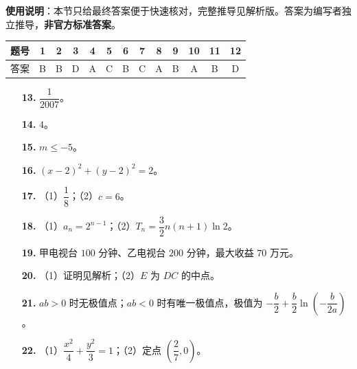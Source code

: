 
\begin{gknotice}
\textbf{使用说明}：本节只给最终答案便于快速核对，完整推导见解析版。答案为编写者独立推导，\textbf{非官方标准答案}。
\end{gknotice}

\begin{center}\begin{tabular}{ccccccccccccc}
\toprule
题号 & 1 & 2 & 3 & 4 & 5 & 6 & 7 & 8 & 9 & 10 & 11 & 12 \\
\midrule
答案 & B & B & D & A & C & B & C & A & B & A & B & D \\
\bottomrule
\end{tabular}\end{center}

\begin{itemize}[leftmargin=2.6em]
  \item[\textbf{13.}] $\dfrac{1}{2007}$。
  \item[\textbf{14.}] $4$。
  \item[\textbf{15.}] $m\leqslant-5$。
  \item[\textbf{16.}] $(x-2)^2+(y-2)^2=2$。
\end{itemize}

\begin{itemize}[leftmargin=2.6em]
  \item[\textbf{17.}] （1）$\dfrac18$；（2）$c=6$。
  \item[\textbf{18.}] （1）$a_n=2^{n-1}$；（2）$T_n=\dfrac32n(n+1)\ln2$。
  \item[\textbf{19.}] 甲电视台 $100$ 分钟、乙电视台 $200$ 分钟，最大收益 $70$ 万元。
  \item[\textbf{20.}] （1）证明见解析；（2）$E$ 为 $DC$ 的中点。
  \item[\textbf{21.}] $ab>0$ 时无极值点；$ab<0$ 时有唯一极值点，极值为 $-\dfrac b2+\dfrac b2\ln\left(-\dfrac{b}{2a}\right)$。
  \item[\textbf{22.}] （1）$\dfrac{x^2}{4}+\dfrac{y^2}{3}=1$；（2）定点 $\left(\dfrac27,0\right)$。
\end{itemize}
